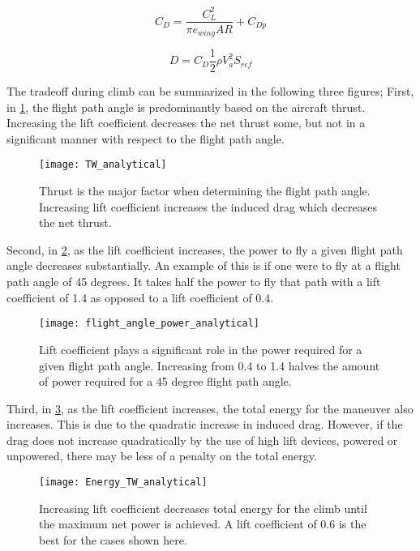 \documentclass[10pt,english]{article}
\begin{document}
\begin{equation}
\label{e:CD}
C_D = \frac{C_L^2}{\pi e_{wing} AR} + C_{Dp}
\end{equation}

\begin{equation}
\label{e:D}
D = C_D \frac{1}{2} \rho V_a^2 S_{ref}
\end{equation}

The tradeoff during climb can be summarized in the following three figures;  First, in \cref{f:TW_analytical}, the flight path angle is predominantly based on the aircraft thrust.  Increasing the lift coefficient decreases the net thrust some, but not in a significant manner with respect to the flight path angle.

\begin{figure}[H]
\centering
\texttt{[image: TW\_analytical]}
\vspace{-5pt}
\caption{Thrust is the major factor when determining the flight path angle.  Increasing lift coefficient increases the induced drag which decreases the net thrust.}
\label{f:TW_analytical}
\end{figure}

Second, in \cref{f:Power_dist_analytical}, as the lift coefficient increases, the power to fly a given flight path angle decreases substantially.  An example of this is if one were to fly at a flight path angle of 45 degrees.  It takes half the power to fly that path with a lift coefficient of 1.4 as opposed to a lift coefficient of 0.4.

\begin{figure}[H]
\centering
\texttt{[image: flight\_angle\_power\_analytical]}
\vspace{-5pt}
\caption{Lift coefficient plays a significant role in the power required for a given flight path angle.  Increasing from 0.4 to 1.4 halves the amount of power required for a 45 degree flight path angle.}
\label{f:Power_dist_analytical}
\end{figure}

Third, in \cref{f:t_compare}, as the lift coefficient increases, the total energy for the maneuver also increases.  This is due to the quadratic increase in induced drag.  However, if the drag does not increase quadratically by the use of high lift devices, powered or unpowered, there may be less of a penalty on the total energy.

\begin{figure}[H]
\centering
\texttt{[image: Energy\_TW\_analytical]}
\vspace{-5pt}
\caption{Increasing lift coefficient decreases total energy for the climb until the maximum net power is achieved.  A lift coefficient of 0.6 is the best for the cases shown here.}
\label{f:t_compare}
\end{figure}
\end{document}
